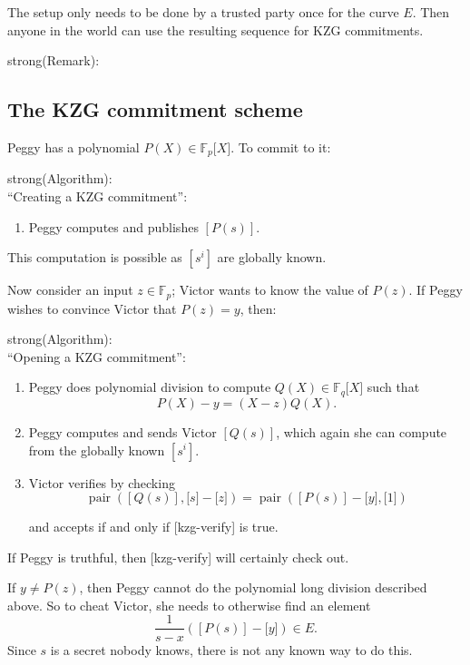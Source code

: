 The setup only needs to be done by a trusted party once for the curve
\(E\). Then anyone in the world can use the resulting sequence for KZG
commitments.

strong(Remark):\\

\subsection{The KZG commitment scheme}

Peggy has a polynomial \(P(X) \in {\mathbb{F}}_{p}\lbrack X\rbrack\). To
commit to it:

strong(Algorithm):\\
``Creating a KZG commitment'':

\begin{enumerate}
\item
  Peggy computes and publishes \(\left\lbrack P(s) \right\rbrack\).
\end{enumerate}

This computation is possible as \(\left\lbrack s^{i} \right\rbrack\) are
globally known.

Now consider an input \(z \in {\mathbb{F}}_{p}\); Victor wants to know
the value of \(P(z)\). If Peggy wishes to convince Victor that
\(P(z) = y\), then:

strong(Algorithm):\\
``Opening a KZG commitment'':

\begin{enumerate}
\item
  Peggy does polynomial division to compute
  \(Q(X) \in {\mathbb{F}}_{q}\lbrack X\rbrack\) such that
  \[P(X) - y = (X - z)Q(X).\]
\item
  Peggy computes and sends Victor \(\left\lbrack Q(s) \right\rbrack\),
  which again she can compute from the globally known
  \(\left\lbrack s^{i} \right\rbrack\).
\item
  Victor verifies by checking
  \[\operatorname{pair}(\left\lbrack Q(s) \right\rbrack,\lbrack s\rbrack - \lbrack z\rbrack) = \operatorname{pair}(\left\lbrack P(s) \right\rbrack - \lbrack y\rbrack,\lbrack 1\rbrack)\]
  \label{kzg-verify}{}

  and accepts if and only if {[}kzg-verify{]} is true.
\end{enumerate}

If Peggy is truthful, then {[}kzg-verify{]} will certainly check out.

If \(y \neq P(z)\), then Peggy cannot do the polynomial long division
described above. So to cheat Victor, she needs to otherwise find an
element
\[\frac{1}{s - x}\left( \left\lbrack P(s) \right\rbrack - \lbrack y\rbrack \right) \in E.\]
Since \(s\) is a secret nobody knows, there is not any known way to do
this.


